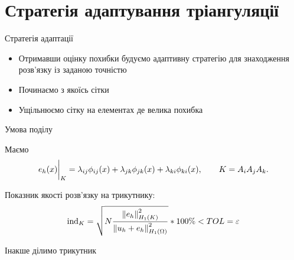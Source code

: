 
\section{Стратегія адаптування тріангуляції}
\frame{\sectionpage}

\begin{frame}{Стратегія адаптації}

	\begin{itemize}
		\item Отримавши оцінку похибки будуємо адаптивну стратегію для знаходження розв'язку із заданою точністю
		\item Починаємо з якоїсь сітки
		\item Ущільнюємо сітку на елементах де велика похибка
	\end{itemize}

\end{frame}

\begin{frame}{Умова поділу}

	Маємо
	\begin{equation}\label{eq:error_element}
		e_h(x)\bigg|_K = \lambda_{ij} \phi_{ij}(x)+\lambda_{jk} \phi_{jk}(x)+\lambda_{ki} \phi_{ki}(x), \qquad K = A_iA_jA_k.
	\end{equation}

	Показник якості розв'язку на трикутнику:
	\begin{equation}\label{eq:error_indicator}
		\text{ind}_K = \sqrt{N \frac
				{\norm{e_h}^2_{H_1(K)}}
				{\norm{u_h+e_h}^2_{H_1(\Omega)}}
		}*100\% < TOL = \varepsilon %
	\end{equation}

	Інакше ділимо трикутник

\end{frame}

\undeff{\error}
